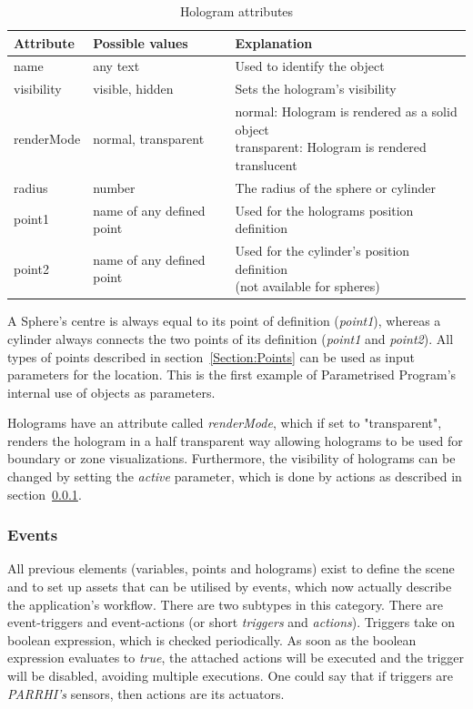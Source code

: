 \begin{table}[!htbp]
	\caption{Hologram attributes}
	\label{Table:HologramAttributes}
	\centering
	\begin{tabular}{lll}
		\toprule
		Attribute & Possible values		& Explanation	\\		
		\midrule
		name & any text & Used to identify the object \\
		visibility & visible, hidden & Sets the hologram's visibility \\
		renderMode & normal, transparent & \parbox[t]{10cm}{ normal: Hologram is rendered as a solid object \\ transparent: Hologram is rendered translucent}\\
		radius & number & The radius of the sphere or cylinder \\
		point1 & name of any defined point & Used for the holograms position definition \\
		point2 & name of any defined point & \parbox[t]{10cm}{ Used for the cylinder's position definition \\ (not available for spheres)} \\
		\bottomrule
	\end{tabular}
\end{table}

A Sphere's centre is always equal to its point of definition (\textit{point1}), whereas a cylinder always connects the two points of its definition (\textit{point1} and \textit{point2}). All types of points described in section~\ref{Section:Points} can be used as input parameters for the location. This is the first example of Parametrised Program's internal use of objects as parameters.

Holograms have an attribute called \textit{renderMode}, which if set to "transparent", renders the hologram in a half transparent way allowing holograms to be used for boundary or zone visualizations. Furthermore, the visibility of holograms can be changed by setting the \textit{active} parameter, which is done by actions as described in section~\ref{Section:Events}.

\subsubsection{Events}\label{Section:Events}
All previous elements (variables, points and holograms) exist to define the scene and to set up assets that can be utilised by events, which now actually describe the application's workflow. There are two subtypes in this category. There are event-triggers and event-actions (or short \textit{triggers} and \textit{actions}). Triggers take on boolean expression, which is checked periodically. As soon as the boolean expression evaluates to \textit{true}, the attached actions will be executed and the trigger will be disabled, avoiding multiple executions. One could say that if triggers are \textit{PARRHI's} sensors, then actions are its actuators.


